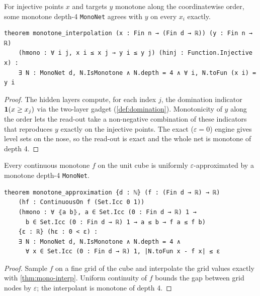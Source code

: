 \begin{theorem}\label{thm:mono-interp}
  \leanok
  For injective points $x$ and targets $y$ monotone along the coordinatewise order, some monotone
  depth-4 \texttt{MonoNet} agrees with $y$ on every $x_i$ exactly.
\end{theorem}
\begin{verbatim}
theorem monotone_interpolation (x : Fin n → (Fin d → ℝ)) (y : Fin n → ℝ)
    (hmono : ∀ i j, x i ≤ x j → y i ≤ y j) (hinj : Function.Injective x) :
    ∃ N : MonoNet d, N.IsMonotone ∧ N.depth = 4 ∧ ∀ i, N.toFun (x i) = y i
\end{verbatim}
\begin{proof}\leanok
  The hidden layers compute, for each index $j$, the domination indicator
  $\mathbf{1}(x\ge x_j)$ via the two-layer gadget (\cref{def:domination}). Monotonicity of $y$
  along the order lets the read-out take a non-negative combination of these indicators that
  reproduces $y$ exactly on the injective points. The exact ($\varepsilon=0$) engine gives level
  sets on the nose, so the read-out is exact and the whole net is monotone of depth 4.
\end{proof}

\begin{theorem}\label{thm:mono-approx}
  \leanok
  Every continuous monotone $f$ on the unit cube is uniformly $\varepsilon$-approximated by a
  monotone depth-4 \texttt{MonoNet}.
\end{theorem}
\begin{verbatim}
theorem monotone_approximation {d : ℕ} (f : (Fin d → ℝ) → ℝ)
    (hf : ContinuousOn f (Set.Icc 0 1))
    (hmono : ∀ ⦃a b⦄, a ∈ Set.Icc (0 : Fin d → ℝ) 1 →
      b ∈ Set.Icc (0 : Fin d → ℝ) 1 → a ≤ b → f a ≤ f b)
    {ε : ℝ} (hε : 0 < ε) :
    ∃ N : MonoNet d, N.IsMonotone ∧ N.depth = 4 ∧
      ∀ x ∈ Set.Icc (0 : Fin d → ℝ) 1, |N.toFun x - f x| ≤ ε
\end{verbatim}
\begin{proof}\leanok
  Sample $f$ on a fine grid of the cube and interpolate the grid values exactly with
  \cref{thm:mono-interp}. Uniform continuity of $f$ bounds the gap between grid nodes by
  $\varepsilon$; the interpolant is monotone of depth 4.
\end{proof}
